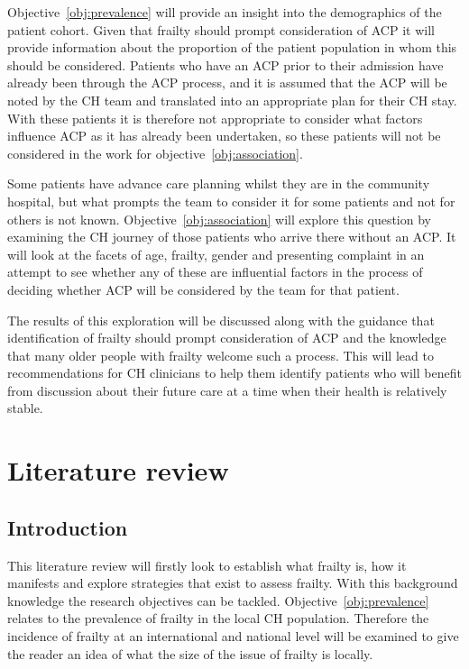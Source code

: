 \documentclass
[
	12pt,
	a4paper,
	oneside,
]{report}
\begin{document}
Objective~\ref{obj:prevalence} will provide an insight into the demographics
of the patient cohort. Given that frailty should prompt consideration of ACP
it will provide information about the proportion of the patient population in
whom this should be considered. Patients who have an ACP prior to their admission
have already been through the ACP process, and it is assumed that the ACP will be 
noted by the CH team and translated into an appropriate plan for their CH stay.
With these patients it is therefore not appropriate to consider what factors 
influence ACP as it has already been undertaken, so these patients will not
be considered in the work for objective~\ref{obj:association}.

Some patients have advance care planning whilst they are in the
community hospital, but what prompts the team to
consider it for some patients and not for others is not known.
Objective~\ref{obj:association} will explore this question by examining the CH
journey of those patients 
who arrive there without an ACP. It will look at the facets of age, frailty, 
gender and presenting complaint in an attempt to see whether any of these are
influential factors in the process of deciding whether ACP
will be considered by the team for that patient.

The results of this exploration will be discussed along with the guidance that 
identification of frailty should prompt consideration of ACP and the knowledge
that many older people with frailty welcome such a process. This will lead to 
recommendations for CH clinicians to help them identify 
patients who will benefit from discussion about their future care at a time 
when their health is relatively stable.

\chapter{Literature review}

\section{Introduction}

This literature review will firstly look to establish what frailty is, how it
manifests and explore strategies that exist to assess frailty. With this 
background knowledge the research objectives can be tackled. 
Objective~\ref{obj:prevalence} relates to the prevalence of frailty in the
local CH population. Therefore the incidence of frailty at an international
and national level will be examined to give the reader an idea of what the
size of the issue of frailty is locally.
\end{document}

